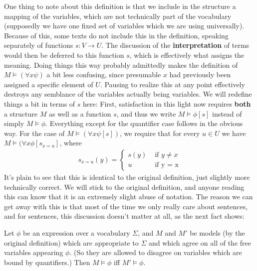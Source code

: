 One thing to note about this definition is that we include in the structure a mapping of the variables, which are not technically part of the vocabulary (supposedly we have one fixed set of variables which we are using universally). Because of this, some texts do not include this in the definition, speaking separately of functions $s: V \to U$. The discussion of the \textbf{interpretation} of terms would then be deferred to this function $s$, which is effectively what assigns the meaning. Doing things this way probably admittedly makes the definition of $M \models (\forall x \psi)$ a bit less confusing, since presumable $x$ had previously been assigned a specific element of $U$. Pausing to realize this at any point effectively destroys any semblance of the variables actually being variables. We will redefine things a bit in terms of $s$ here: First, satisfaction in this light now requires \textbf{both} a structure $M$ as well as a function $s$, and thus we write $M \models \phi[s]$ instead of simply $M \models \phi$. Everything except for the quantifier case follows in the obvious way. For the case of $M \models (\forall x \psi[s])$, we require that for every $u \in U$ we have $M \models (\forall x \phi[s_{x=u}]$, where
\begin{align}
    s_{x=u}(y) = \begin{cases}
                 s(y) & \textrm{ if $y \neq x$}\\
                 u & \textrm{ if y = x}
              \end{cases}
\end{align}
It's plain to see that this is identical to the original definition, just slightly more technically correct. We will stick to the original definition, and anyone reading this can know that it is an extremely slight abuse of notation. The reason we can get away with this is that most of the time we only really care about sentences, and for sentences, this discussion doesn't matter at all, as the next fact shows:
\begin{fact}
    Let $\phi$ be an expression over a vocabulary $\Sigma$, and $M$ and $M'$ be models (by the original definition) which are appropriate to $\Sigma$ and which agree on all of the free variables appearing $\phi$. (So they are allowed to disagree on variables which are bound by quantifiers.) Then $M \models \phi$ iff $M' \models \phi$.  
\end{fact}
